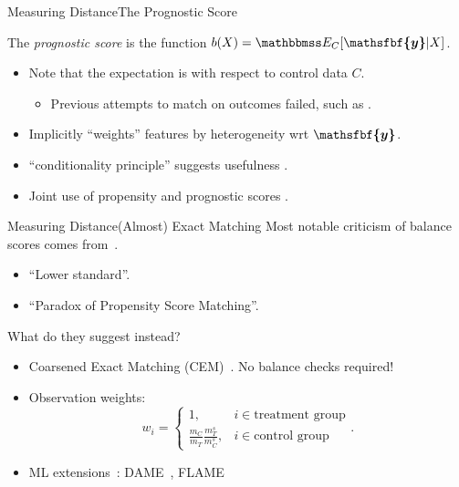 \documentclass[11pt, compress]{beamer}
\renewcommand{\vec}[1]{\ensuremath{\boldsymbol{\mathsfbf{#1}}}}
\newcommand{\mat}[1]{\ensuremath{#1}}
\begin{document}
\begin{frame}{Measuring Distance}{The Prognostic Score}
	\begin{definition}
		The \emph{prognostic score} is the function \( b(\mat{X}) = \mathbbmss E_{C} [\vec{y} | \mat{X} ] \).
	\end{definition}
	\begin{itemize}
		\item Note that the expectation is with respect to control data $C$.
		\begin{itemize}
			\item Previous attempts to match on outcomes failed, such as \textcite{miettinen_stratification_1976}.
		\end{itemize}
		\item Implicitly ``weights'' features by heterogeneity wrt $\vec{y}$.
		\item  ``conditionality principle'' suggests usefulness \textcite{hansen_prognostic_2008}.
		\item Joint use of propensity and prognostic scores \textcite{leacy_joint_2014}.
	\end{itemize}
\end{frame}

\begin{frame}{Measuring Distance}{(Almost) Exact Matching}
	Most notable criticism of balance scores comes from~\textcite{king_why_2019}.
	\begin{itemize}
		\item ``Lower standard''.
		\item ``Paradox of Propensity Score Matching''.
	\end{itemize}
	What do they suggest instead?
	\begin{itemize}
		\item Coarsened Exact Matching (CEM)~\parencite{iacus_causal_2012}. No balance checks required!
		\item Observation weights:
			\begin{equation}
				w_{i}= \begin{cases}1, & i \in \text{treatment group} \\ \frac{m_{C}}{m_{T}} \frac{m_{T}^{s}}{m_{C}^{s}}, & i \in \text{control group} \end{cases}.
			\end{equation}
		\item ML extensions~\parencite{gupta_dame-flame_2021}: DAME~\parencite{liu_interpretable_2019}, FLAME~\parencite{wang_flame_2021}
	\end{itemize}
\end{frame}
\end{document}
